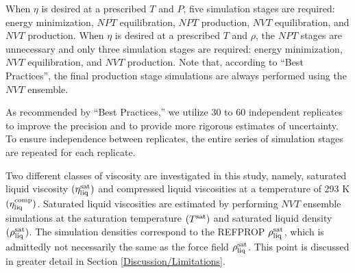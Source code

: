 \documentclass[preprint,review,12pt]{elsarticle}
\begin{document}
	When $\eta$ is desired at a prescribed $T$ and $P$, five simulation stages are required: energy minimization, $NPT$ equilibration, $NPT$ production, $NVT$ equilibration, and $NVT$ production. When $\eta$ is desired at a prescribed $T$ and $\rho$, the $NPT$ stages are unnecessary and only three simulation stages are required: energy minimization, $NVT$ equilibration, and $NVT$ production. Note that, according to ``Best Practices'', the final production stage simulations are always performed using the $NVT$ ensemble. 
	
	As recommended by ``Best Practices,'' we utilize 30 to 60 independent replicates to improve the precision and to provide more rigorous estimates of uncertainty. To ensure independence between replicates, the entire series of simulation stages are repeated for each replicate. 
	
	
	
	
%	
	
	
		
	Two different classes of viscosity are investigated in this study, namely, saturated liquid viscosity $(\eta_{\rm liq}^{\rm sat})$ and compressed liquid viscosities at a temperature of 293 K $(\eta_{\rm liq}^{\rm comp})$. Saturated liquid viscosities are estimated by performing $NVT$ ensemble simulations at the saturation temperature $(T^{\rm sat})$ and saturated liquid density $(\rho_{\rm liq}^{\rm sat})$. The simulation densities correspond to the REFPROP $\rho_{\rm liq}^{\rm sat}$, which is admittedly not necessarily the same as the force field $\rho_{\rm liq}^{\rm sat}$. This point is discussed in greater detail in Section \ref{Discussion/Limitations}. 
	
\end{document}
